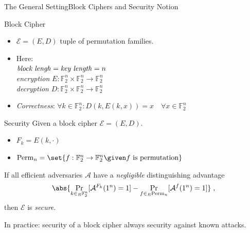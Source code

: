 \documentclass[%
    10pt,
    professionalfont,
    aspectratio=169,
]{beamer}
\DeclareMathOperator{\Prob}{Pr}
\newcommand{\F}{\mathbb{F}}
\begin{document}
\begin{frame}{The General Setting}{Block Ciphers and Security Notion}
    \centering
    \begin{minipage}{0.47\textwidth}
    \begin{block}{Block Cipher}
        \begin{itemize}
            \item $\mathcal{E} = (E, D)$ tuple of permutation families.\\[10pt]
            \item Here:\\
                  $\text{\emph{block lengh}} = \text{\emph{key length}} = n$\\
                  \emph{encryption} $E : \F_2^n \times \F_2^n \to \F_2^n$\\
                  \emph{decryption} $D : \F_2^n \times \F_2^n \to \F_2^n$\\[10pt]
            \item \emph{Correctness}: $\forall k \in \F_2^n: D(k, E(k, x)) = x \quad \forall x \in \F_2^n$
        \end{itemize}
        \vspace{1pt}
    \end{block}
    \end{minipage}%
    \hspace{5pt}%
    \pause%
    \begin{minipage}{0.48\textwidth}
    \begin{block}{Security}
        Given a block cipher $\mathcal{E} = (E, D)$.
        \begin{itemize}
            \item $F_k = E(k, \cdot)$
            \item $\mathrm{Perm}_n = \set{f : \F_2^n \to \F_2^n \given f\ \text{is permutation}}$
        \end{itemize}
        If all efficient adversaries $\mathcal{A}$ have a \emph{negligible} distinguishing advantage
        \begin{equation*}
            \abs{\Prob_{k \in_R \F_2^n}[\mathcal{A}^{F_k}(1^n) = 1] - \Prob_{f \in_R \mathrm{Perm}_n}[\mathcal{A}^{f}(1^n) = 1]}\;,
        \end{equation*}
        then $\mathcal{E}$ is \emph{secure}.
    \end{block}
    \end{minipage}
    \pause

    \vfill
    In practice: security of a block cipher always security against known attacks.
\end{frame}
\end{document}
